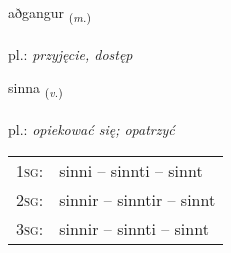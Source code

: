 \documentclass[frontgrid, backgrid]{flacards}\usepackage[]{graphicx}\usepackage[]{xcolor}
\begin{document}
\renewcommand{\flhead}{\vskip5pt \fboxsep=0pt {\small\bfseries\footnotesize Nafnorð | Noun}}
\renewcommand{\fcfoot}{\vskip5pt \fboxsep=0pt \hspace{2pt}{\small\bfseries\footnotesize 1K}}

\renewcommand{\blhead}{\vskip5pt {\small\bfseries\footnotesize Nafnorð | Noun }}
\renewcommand{\bcfoot}{\vskip5pt \hspace{2pt}{\small\bfseries\footnotesize 1K}}


{aðgangur \small{\textsubscript{(\textit{m.})}} \\[1ex] %
\textphonetic{[aðkauŋkʏr]} \\
pl.: \emph{przyjęcie, dostęp} \\  [2ex]
\renewcommand*{\arraystretch}{0.8}
}

\renewcommand{\flhead}{\vskip5pt \fboxsep=0pt {\small\bfseries\footnotesize Sagnorð | Verb}}
\renewcommand{\fcfoot}{\vskip5pt \fboxsep=0pt \hspace{2pt}{\small\bfseries\footnotesize 1K}}

\renewcommand{\blhead}{\vskip5pt {\small\bfseries\footnotesize Sagnorð | Verb }}
\renewcommand{\bcfoot}{\vskip5pt \hspace{2pt}{\small\bfseries\footnotesize 1K}}


{sinna \small{\textsubscript{(\textit{v.})}} \\[1ex] %
\textphonetic{[sɪna]} \\
pl.: \emph{opiekować się; opatrzyć} \\  [2ex]
\renewcommand*{\arraystretch}{0.8}
\begin{tabular}{p{1cm}l}
\textsc{1sg}: & sinni -- sinnti -- sinnt \\ 
\textsc{2sg}: & sinnir -- sinntir -- sinnt \\ 
\textsc{3sg}: & sinnir -- sinnti -- sinnt \\ 
\end{tabular}
}
\end{document}
